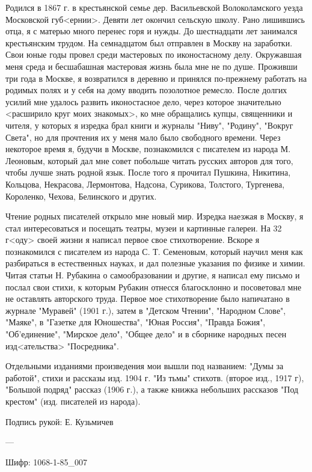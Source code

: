 Родился в 1867 г. в крестьянской семье дер. Васильевской Волоколамского уезда Московской губ<ернии>. Девяти лет окончил сельскую школу. Рано лишившись отца, я с матерью много перенес горя и нужды. До шестнадцати лет занимался крестьянским трудом. На семнадцатом был отправлен в Москву на заработки. Свои юные годы провел среди мастеровых по иконостасному делу. Окружавшая меня среда и бесшабашная мастеровая жизнь была мне не по душе. Проживши три года в Москве, я возвратился в деревню и принялся по-прежнему работать на родимых полях и у себя на дому вводить позолотное ремесло. После долгих усилий мне удалось развить иконостасное дело, через которое значительно <расширило круг моих знакомых>, ко мне обращались купцы, священники и чителя, у которых я изредка брал книги и журналы "Ниву", "Родину", "Вокруг Света", но для прочтения их у меня мало было свободного времени. Через некоторое время я, будучи в Москве, познакомился с писателем из народа М. Леоновым, который дал мне совет побольше читать русских авторов для того, чтобы лучше знать родной язык. После того я прочитал Пушкина, Никитина, Кольцова, Некрасова, Лермонтова, Надсона, Сурикова, Толстого, Тургенева, Короленко, Чехова, Белинского и других.

Чтение родных писателей открыло мне новый мир. Изредка наезжая в Москву, я стал интересоваться и посещать театры, музеи и картинные галереи. На 32 г<оду> своей жизни я написал первое свое стихотворение. Вскоре я познакомился с писателем из народа С. Т. Семеновым, который научил меня как разбираться в естественных науках, и дал полезные указания по физике и химии. Читая статьи Н. Рубакина о самообразовании и другие, я написал ему письмо и послал свои стихи, к которым Рубакин отнесся благосклонно и посоветовал мне не оставлять авторского труда. Первое мое стихотворение было напичатано в журнале "Муравей" (1901 г.), затем в "Детском Чтении", "Народном Слове", "Маяке", в "Газетке для Юношества", "Юная Россия", "Правда Божия", "Об'единение", "Мирское дело", "Общее дело" и в сборнике народных песен изд<ательства> "Посредника". 

Отдельными изданиями произведения мои вышли под названием: "Думы за работой", стихи и рассказы изд. 1904 г. "Из тьмы" стихотв. (второе изд., 1917 г), "Большой подряд" рассказ (1906 г.), а также книжка небольших рассказов "Под крестом" (изд. писателей из народа).

Подпись рукой: Е. Кузьмичев

---

Шифр:   1068-1-85_007

